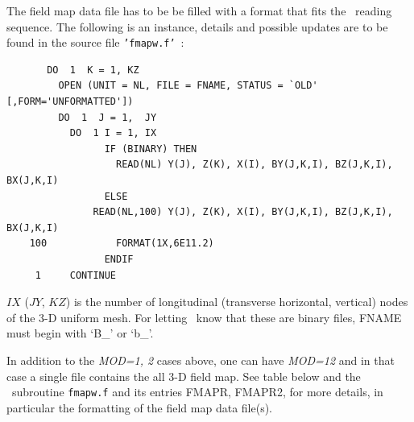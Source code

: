 \medskip

\noindent The field map data file has to be be filled with a 
format that fits the  \FORTRAN\ reading sequence. 
The following is an instance, details and possible updates are to be found in the source  
file \texttt{'fmapw.f'}~:  

{\footnotesize
\begin{verbatim}
	   DO  1  K = 1, KZ
	     OPEN (UNIT = NL, FILE = FNAME, STATUS = `OLD' [,FORM='UNFORMATTED'])
	     DO  1  J = 1,  JY  
	       DO  1 I = 1, IX
                 IF (BINARY) THEN
                   READ(NL) Y(J), Z(K), X(I), BY(J,K,I), BZ(J,K,I), BX(J,K,I)
                 ELSE
	           READ(NL,100) Y(J), Z(K), X(I), BY(J,K,I), BZ(J,K,I), BX(J,K,I)
    100	           FORMAT(1X,6E11.2)
                 ENDIF
     1     CONTINUE
\end{verbatim}}
\medskip

\noindent $IX$ ($JY$, $KZ$)  is   the number of longitudinal 
(transverse horizontal, vertical) nodes of the 3-D uniform mesh. For letting \zgou\ know that these are binary files, 
FNAME must begin with  \mbox{`B\_'} or  \mbox{`b\_'}.  

\medskip


\noindent In addition to the \textsl{MOD=1, 2} cases above, one can have \textsl{MOD=12} and in that case a single file 
contains the all 3-D field map. 
See  table below and the \FORTRAN\  subroutine \texttt{fmapw.f} and its entries FMAPR, FMAPR2, for more details, in particular 
the  formatting of the field map data file(s). 

\medskip


